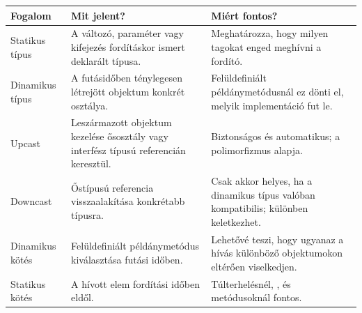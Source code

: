 \begin{tabularx}{\textwidth}{L{32mm}X X}
\toprule
\textbf{Fogalom} & \textbf{Mit jelent?} & \textbf{Miért fontos?} \\
\midrule
Statikus típus & A változó, paraméter vagy kifejezés fordításkor ismert deklarált típusa. & Meghatározza, hogy milyen tagokat enged meghívni a fordító. \\
Dinamikus típus & A futásidőben ténylegesen létrejött objektum konkrét osztálya. & Felüldefiniált példánymetódusnál ez dönti el, melyik implementáció fut le. \\
Upcast & Leszármazott objektum kezelése ősosztály vagy interfész típusú referencián keresztül. & Biztonságos és automatikus; a polimorfizmus alapja. \\
Downcast & Őstípusú referencia visszaalakítása konkrétabb típusra. & Csak akkor helyes, ha a dinamikus típus valóban kompatibilis; különben  keletkezhet. \\
Dinamikus kötés & Felüldefiniált példánymetódus kiválasztása futási időben. & Lehetővé teszi, hogy ugyanaz a hívás különböző objektumokon eltérően viselkedjen. \\
Statikus kötés & A hívott elem fordítási időben eldől. & Túlterhelésnél, ,  és  metódusoknál fontos. \\
\bottomrule
\end{tabularx}
